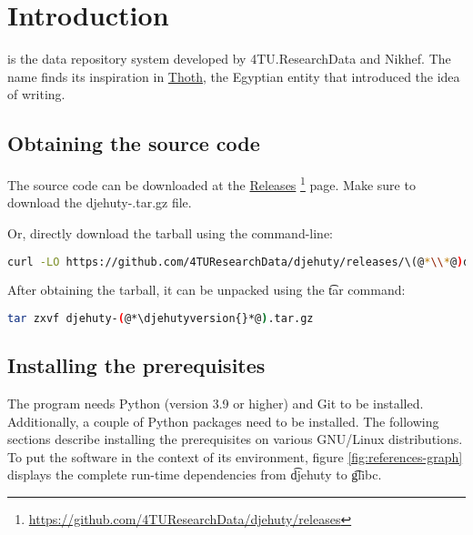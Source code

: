 \chapter{Introduction}

 is the data repository system developed by
4TU.ResearchData and Nikhef.  The name finds its inspiration in
\href{https://en.wikipedia.org/wiki/Thoth}{Thoth}, the Egyptian
entity that introduced the idea of writing.

\section{Obtaining the source code}
\label{sec:obtaining-tarball}

  \begin{sloppypar}
  The source code can be downloaded at the
  \href{https://github.com/4TUResearchData/djehuty/releases}%
  {Releases}%
  \footnote{\url{https://github.com/4TUResearchData/djehuty/releases}}
  page.  Make sure to download the {\fontfamily{\ttdefault}\selectfont
    djehuty-\djehutyversion{}.tar.gz} file.
  \end{sloppypar}

  Or, directly download the tarball using the command-line:

\begin{lstlisting}[language=bash]
curl -LO https://github.com/4TUResearchData/djehuty/releases/\(@*\\*@)download/v(@*\djehutyversion{}*@)/djehuty-(@*\djehutyversion{}*@).tar.gz
\end{lstlisting}

  After obtaining the tarball, it can be unpacked using the \t{tar}
  command:

\begin{lstlisting}[language=bash]
tar zxvf djehuty-(@*\djehutyversion{}*@).tar.gz
\end{lstlisting}

\section{Installing the prerequisites}
\label{sec:prerequisites}

  The  program needs Python (version 3.9 or higher) and
  Git to be installed.  Additionally, a couple of Python packages need
  to be installed.  The following sections describe installing the
  prerequisites on various GNU/Linux distributions.  To put the software in
  the context of its environment, figure \ref{fig:references-graph} displays
  the complete run-time dependencies from \t{djehuty} to \t{glibc}.

